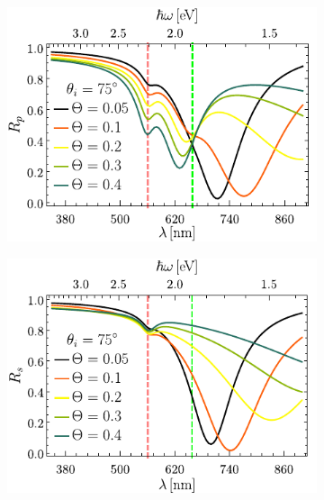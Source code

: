 \begin{figure}[h!]\centering\hspace*{-1.5em}
	\begin{subfigure}{.01\linewidth}\caption{}\label{sfig:R-ATR4-cutp}\vspace{4.5cm}\end{subfigure}
	\begin{subfigure}{.45\linewidth}\hspace*{-1.5em}
	\includegraphics[scale=1]{2-Resultados/figs/1-Wp4ThetaVar/cut_angle_75_p.pdf}\end{subfigure}
	\begin{subfigure}{.01\linewidth}\caption{}\label{sfig:R-ATR4-cuts}\vspace{4.5cm}\end{subfigure}\hspace*{-1.em}
	\begin{subfigure}{.45\linewidth}\centering
	\includegraphics[scale=1 ]{2-Resultados/figs/1-Wp4ThetaVar/cut_angle_75_s.pdf}\end{subfigure}\vspace*{-.5em}

\end{figure}
